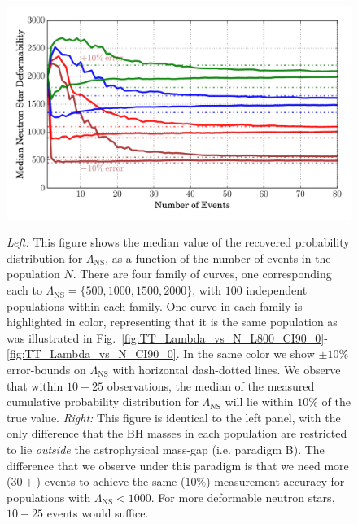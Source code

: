 \documentclass[aps,prd,amsmath,floats,floatfix, twocolumn,
superscriptaddress,nofootinbib,showpacs]{revtex4-1}
\newcommand{\lambdans}{\Lambda_\mathrm{NS}}
\begin{document}
\begin{figure}
\includegraphics[trim=20 0 0 0, width=1.02\columnwidth]{plots/LambdaMedian90pc_vs_N_AstroPopulation}\\
\caption{%
{\it Left:} This figure shows the median value of the recovered
probability distribution for $\lambdans$, as a function of the number of events
in the population $N$. There are four family of curves, one corresponding each
to $\lambdans=\{500,1000,1500,2000\}$, with $100$ independent populations
within each family. One curve in each family is highlighted in color, 
representing that it is the same population as was illustrated in
Fig.~\ref{fig:TT_Lambda_vs_N_L800_CI90_0}-\ref{fig:TT_Lambda_vs_N_CI90_0}.
In the same color we show $\pm 10\%$ error-bounds on $\lambdans$ with
horizontal dash-dotted lines. We observe that within $10-25$ observations, 
the median of the measured cumulative probability distribution for $\lambdans$
will lie within $10\%$ of the true value.
{\it Right:} This figure is identical to the left panel, with the only
difference that the BH masses in each population are restricted to lie
{\it outside} the astrophysical mass-gap (i.e. paradigm B). The difference that
we observe under this paradigm is that we need more ($30+$) events to achieve 
the same ($10\%$) measurement accuracy for populations with $\lambdans<1000$.
For more deformable neutron stars, $10-25$ events would suffice.
}
\label{fig:TT_LambdaMedian_vs_N_AllInOne}
\end{figure}
%
% 
\end{document}
